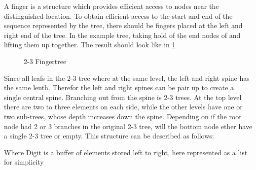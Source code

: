 A finger is a structure which provides efficient access to nodes near the
distinguished location. To obtain efficient access to the start and end of the
sequence represented by the tree, there should be fingers placed at the left and
right end of the tree. In the example tree, taking hold of the end nodes of and
lifting them up together. The result should look like in \cref{fig:fingertree}
\begin{figure}[!h]
  \centering
  \caption{2-3 Fingertree
  \label{fig:fingertree}}
\end{figure}

Since all leafs in the 2-3 tree where at the same level, the left and right
spine has the same lenth. Therefor the left and right spines can be pair up to
create a single central spine. Branching out from the spine is 2-3 trees. At the
top level there are two to three elements on each side, while the other levels
have one or two sub-trees, whose depth increases down the spine. Depending on if
the root node had 2 or 3 branches in the original 2-3 tree, will the bottom node
ether have a single 2-3 tree or empty. This structure can be described as
follows:

Where Digit is a buffer of elements stored left to right, here represented as a
list for simplicity

